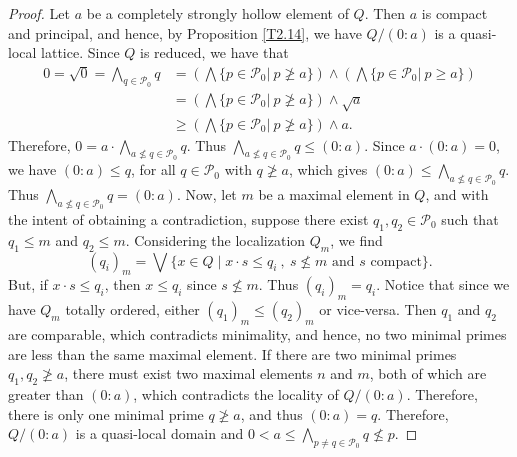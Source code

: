 \documentclass[11pt,english]{amsart}
\theoremstyle{definition}
\numberwithin{equation}{section}
\theoremstyle{remark}
\def\leq{\leqslant}
\begin{document}
	\begin{proof}
		Let $a$ be a completely strongly hollow element of $Q$. Then $a$ is compact and principal, and hence, by Proposition \ref{T2.14}, we have $Q/(0:a)$ is a quasi-local lattice. Since $Q$ is reduced, we have that \begin{align*}
			0=\sqrt{0}=\bigwedge_{q\in \mathcal{P}_0}q&=\left(\bigwedge\{p\in \mathcal{P}_0| \:p\ngeq a\}\right)\wedge\left(\bigwedge\{p\in \mathcal{P}_0| \:p\geq a\}\right) \\
			&=\left(\bigwedge\{p\in \mathcal{P}_0| \:p\ngeq a\}\right)\wedge\sqrt{a} \\
			&\geqslant \left(\bigwedge\{p\in \mathcal{P}_0| \:p\ngeq a\}\right)\wedge a.
		\end{align*}
		Therefore, \(0=a\cdot \bigwedge_{a\nleq q\in \mathcal{P}_0}q\). Thus $\bigwedge_{a\nleq q\in \mathcal{P}_0}q\leq (0:a)$. Since $a\cdot (0:a)=0$, we have  $(0:a)\leq q$, for all $q\in \mathcal{P}_0$ with $q\ngeq a$, which gives $(0:a)\leq\bigwedge_{a\nleq q\in \mathcal{P}_0}q$. Thus $\bigwedge_{a\nleq q\in \mathcal{P}_0}q=(0:a)$. Now, let $m$ be a maximal element in $Q$, and with the intent of obtaining a contradiction, suppose there exist $q_1,q_2\in \mathcal{P}_0$ such that $q_1\leq m$ and $q_2\leq m$. Considering the localization $Q_m$, we find \[(q_i)_m=\bigvee\{x\in Q\mid x\cdot s\leq q_i\:,\: s\nleq m\text{ and } s\text{ compact}\}.\]
		But, if $x\cdot s\leq q_i$, then $x\leq q_i$ since $s\nleq m$. Thus \((q_i)_m=q_i\). Notice that since we have $Q_m$ totally ordered, either $(q_1)_m\leq (q_2)_m$ or vice-versa. Then $q_1$ and $q_2$ are comparable, which contradicts minimality, and hence,  no two minimal primes are less than the same maximal element. If there are two minimal primes $q_1,q_2\ngeq a$, there must exist two maximal elements $n$ and $m$, both of which are greater than $(0:a)$, which contradicts the locality of $Q/(0:a)$. Therefore, there is only one minimal prime $q\ngeq a$, and thus $(0:a)=q$. Therefore, $Q/(0:a)$ is a quasi-local domain and $0<a\leq \bigwedge_{p\neq q\in \mathcal{P}_0}q\nleq p$.
		

\end{proof}
\end{document}
